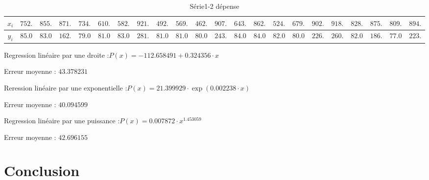 \documentclass{report}
\begin{document}
      \newpage
   \begin{table}[h]
	\centering
	\begin{tabular}{| c | c | c | c | c | c | c | c | c | c | c | c | c | c | c | c | c | c | c | c | c | c |}
	\hline 
	$x_{i}$ & $752.000000$ & $855.000000$ & $871.000000$ & $734.000000$ & $610.000000$ & $582.000000$ & $921.000000$ & $492.000000$ & $569.000000$ & $462.000000$ & $907.000000$ & $643.000000$ & $862.000000$ & $524.000000$ & $679.000000$ & $902.000000$ & $918.000000$ & $828.000000$ & $875.000000$ & $809.000000$ & $894.000000$ \\ 
	\hline 
	$y_{i}$ & $85.000000$ & $83.000000$ & $162.000000$ & $79.000000$ & $81.000000$ & $83.000000$ & $281.000000$ & $81.000000$ & $81.000000$ & $80.000000$ & $243.000000$ & $84.000000$ & $84.000000$ & $82.000000$ & $80.000000$ & $226.000000$ & $260.000000$ & $82.000000$ & $186.000000$ & $77.000000$ & $223.000000$ \\ 
	\hline 
	\end{tabular}
	\caption{Série1-2 dépense}
	\label{Jeux d'essais interpolation 3.3 Série 1 et 2}
      \end{table}
	Regression linéaire par une droite :$P(x) =  - 112.658491 + 0.324356 \cdot x$
	
	Erreur moyenne : $43.378231$
	
	Reression linéaire par une exponentielle :$P(x) = 21.399929\cdot \exp(0.002238 \cdot x)$
	
	Erreur moyenne : $40.094599$
	
	Regression linéaire par une puissance :$P(x) = 0.007872 \cdot x^{1.453059}$
	
	Erreur moyenne : $42.696155$
      
  \chapter{Conclusion}
\end{document}
